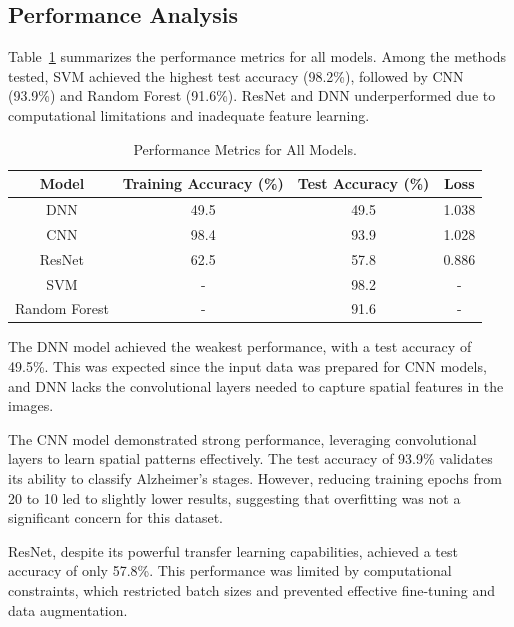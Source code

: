 \documentclass[runningheads]{llncs}
\begin{document}
\subsection{Performance Analysis}

Table~\ref{tab:performance_metrics} summarizes the performance metrics for all models. Among the methods tested, SVM achieved the highest test accuracy (98.2\%), followed by CNN (93.9\%) and Random Forest (91.6\%). ResNet and DNN underperformed due to computational limitations and inadequate feature learning.

\begin{table}[htbp]
    \centering
    \caption{Performance Metrics for All Models.}
    \label{tab:performance_metrics}
    \begin{tabular}{|c|c|c|c|}
        \hline
        \textbf{Model} & \textbf{Training Accuracy (\%)} & \textbf{Test Accuracy (\%)} & \textbf{Loss} \\
        \hline
        DNN            & 49.5                            & 49.5                        & 1.038         \\
        CNN            & 98.4                            & 93.9                        & 1.028         \\
        ResNet         & 62.5                            & 57.8                        & 0.886         \\
        SVM            & -                               & 98.2                        & -             \\
        Random Forest  & -                               & 91.6                        & -             \\
        \hline
    \end{tabular}
\end{table}

The DNN model achieved the weakest performance, with a test accuracy of 49.5\%. This was expected since the input data was prepared for CNN models, and DNN lacks the convolutional layers needed to capture spatial features in the images.

The CNN model demonstrated strong performance, leveraging convolutional layers to learn spatial patterns effectively. The test accuracy of 93.9\% validates its ability to classify Alzheimer’s stages. However, reducing training epochs from 20 to 10 led to slightly lower results, suggesting that overfitting was not a significant concern for this dataset.

ResNet, despite its powerful transfer learning capabilities, achieved a test accuracy of only 57.8\%. This performance was limited by computational constraints, which restricted batch sizes and prevented effective fine-tuning and data augmentation.
\end{document}
